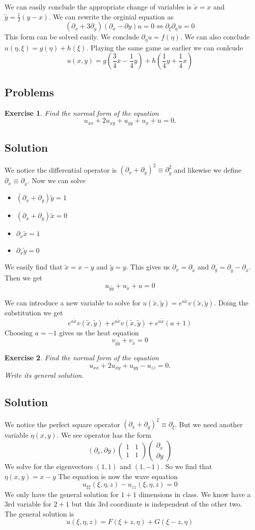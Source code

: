 \documentclass[11pt,a4paper]{article}
\newtheorem*{exercise}{Exercise}
\newcommand{\solution}[1]{
	\subsection*{Solution}
	#1
}
\newcommand{\problems}[1]{
	\subsection*{Problems}
	#1
}
\begin{document}
We can easily conclude the appropriate change of variables is $\tilde{x}=x$ and $\tilde{y}=\frac{1}{2}(y-x)$.
We can rewrite the orginial equation as
$$
(\partial_{x}+3\partial_{y})(\partial_{x}-\partial{y})u = 0 \Leftrightarrow \partial_{\xi}\partial_{\eta}u = 0
$$
This form can be solved easily. We conclude $\partial_{\eta}u = f(\eta)$. We can also conclude $u(\eta,\xi) = g(\eta)+h(\xi)$. Playing the same game as earlier we can conlcude
$$
u(x,y) =  g(\frac{3}{4}x-\frac{1}{4}y)+h(\frac{1}{4}y+\frac{1}{4}x)
$$
\problems{
	\begin{exercise}
		Find the normal form of the equation
		\[
		u_{xx} + 2u_{xy} + u_{yy} + u_{x} + u = 0.
		\]
	\end{exercise}
	\solution{We notice the differential operator is $(\partial_{x}+\partial_{y})^{2}\equiv \partial_{\tilde{y}}^{2}$ and likewise we define $\partial_{x}\equiv \partial_{\tilde{x}}$. Now we can solve
\begin{itemize}
\item $(\partial_{x}+\partial_{y})\tilde{y} = 1$
\item $(\partial_{x}+\partial_{y})\tilde{x} = 0$
\item $\partial_{x}\tilde{x} = 1$
\item $\partial_{x}\tilde{y} = 0$
\end{itemize}
We easily find that $\tilde{x} =  x - y$ and $\tilde{y} =y$. This gives us $\partial_{x} = \partial_{\tilde{x}}$ and $\partial_{y} = \partial_{\tilde{y}}-\partial_{\tilde{x}}$. Then we get
$$
u_{\tilde{y}\tilde{y}} + u_{\tilde{x}} + u = 0
$$

We can introduce a new variable to solve for $u(\tilde{x},\tilde{y}) = e^{a\tilde{x}}v(\tilde{x},\tilde{y})$. Doing the substitution we get
$$
e^{a\tilde{x}}v(\tilde{x},\tilde{y})+e^{a\tilde{x}}v(\tilde{x},\tilde{y})+e^{a\tilde{x}}(a+1)
$$
Choosing $a = -1$ gives us the heat equation
$$
v_{\tilde{y}\tilde{y}} + v_{\tilde{x}} = 0
$$
}
	\begin{exercise}
		Find the normal form of the equation
		\[
		u_{xx} + 2u_{xy} + u_{yy} - u_{zz} = 0.
		\]
		Write its general solution.
	\end{exercise}
		}
		\solution{
		We notice the perfect square operator $(\partial_{x}+\partial_{y})^{2}\equiv \partial_{\xi}$. But we need another variable $\eta(x,y)$. We see operator has the form
		$$
	(\partial_{x},\partial{y})
	\begin{pmatrix}
			1 & 1 \\
			1 & 1
\end{pmatrix}
\begin{pmatrix}
\partial_{x} \\
\partial{y}			
\end{pmatrix}
		$$
	We solve for the eigenvectors $(1,1)$ and $(1,-1)$. So we find that $\eta(x,y)=x-y$ The equation is now the wave equation
	$$
	u_{\xi\xi}(\xi,\eta,z) - u_{zz}(\xi,\eta,z) = 0
	$$ We only have the general solution for $1+1$ dimensions in class. We know have a 3rd variable for $2+1$ but this 3rd coordinate is independent of the other two. The general solution is
$$	
	u(\xi,\eta,z) = F(\xi+z,\eta)+G(\xi-z,\eta)
$$
	
		}
	
\end{document}
